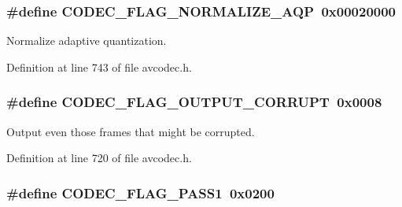\subsubsection[{\texorpdfstring{C\+O\+D\+E\+C\+\_\+\+F\+L\+A\+G\+\_\+\+N\+O\+R\+M\+A\+L\+I\+Z\+E\+\_\+\+A\+QP}{CODEC_FLAG_NORMALIZE_AQP}}]{\setlength{\rightskip}{0pt plus 5cm}\#define C\+O\+D\+E\+C\+\_\+\+F\+L\+A\+G\+\_\+\+N\+O\+R\+M\+A\+L\+I\+Z\+E\+\_\+\+A\+QP~0x00020000}\hypertarget{group__lavc__core_gafb83abde2c1e8a275b8098dbaec2dab6}{}\label{group__lavc__core_gafb83abde2c1e8a275b8098dbaec2dab6}


Normalize adaptive quantization. 



Definition at line 743 of file avcodec.\+h.

\subsubsection[{\texorpdfstring{C\+O\+D\+E\+C\+\_\+\+F\+L\+A\+G\+\_\+\+O\+U\+T\+P\+U\+T\+\_\+\+C\+O\+R\+R\+U\+PT}{CODEC_FLAG_OUTPUT_CORRUPT}}]{\setlength{\rightskip}{0pt plus 5cm}\#define C\+O\+D\+E\+C\+\_\+\+F\+L\+A\+G\+\_\+\+O\+U\+T\+P\+U\+T\+\_\+\+C\+O\+R\+R\+U\+PT~0x0008}\hypertarget{group__lavc__core_ga9a722d4cebcca23c176a445ada262bb1}{}\label{group__lavc__core_ga9a722d4cebcca23c176a445ada262bb1}


Output even those frames that might be corrupted. 



Definition at line 720 of file avcodec.\+h.

\subsubsection[{\texorpdfstring{C\+O\+D\+E\+C\+\_\+\+F\+L\+A\+G\+\_\+\+P\+A\+S\+S1}{CODEC_FLAG_PASS1}}]{\setlength{\rightskip}{0pt plus 5cm}\#define C\+O\+D\+E\+C\+\_\+\+F\+L\+A\+G\+\_\+\+P\+A\+S\+S1~0x0200}\hypertarget{group__lavc__core_ga7520c1b76c29de7d2380df7c76fdeb80}{}\label{group__lavc__core_ga7520c1b76c29de7d2380df7c76fdeb80}


